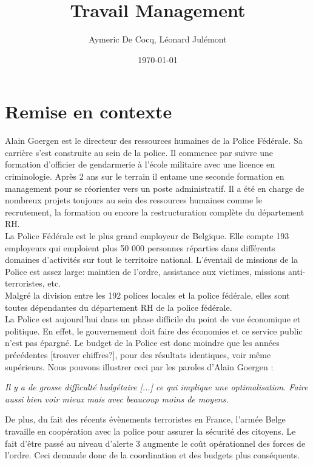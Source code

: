 \documentclass[12pt]{article}
\title{Travail Management}
\author{Aymeric De Cocq, Léonard Julémont}
\date{\today}
\begin{document}
\maketitle

\section{Remise en contexte}


Alain Goergen est le directeur des ressources humaines de la Police Fédérale. Sa carrière s'est construite au sein de la police. Il commence par suivre une formation d'officier de gendarmerie à l'école militaire avec une licence en criminologie. Après 2 ans sur le terrain il entame une seconde formation en management pour se réorienter vers un poste administratif. Il a été en charge de nombreux projets toujours au sein des ressources humaines comme le recrutement, la formation ou encore la restructuration complète du département RH.\\

La Police Fédérale est le plus grand employeur de Belgique. Elle compte 193 employeurs qui emploient plus 50 000 personnes réparties dans différents domaines d'activités sur tout le territoire national. L'éventail de missions de la Police est assez large: maintien de l'ordre, assistance aux victimes, missions anti-terroristes, etc.\\

Malgré la division entre les 192 polices locales et la police fédérale, elles sont toutes dépendantes du département RH de la police fédérale.\\
 
La Police est aujourd'hui dans un phase difficile du point de vue économique et politique. En effet, le gouvernement doit faire des économies et ce service public n'est pas épargné. Le budget de la Police est donc moindre que les années précédentes [trouver chiffres?], pour des résultats identiques, voir même supérieurs. Nous pouvons illustrer ceci par les paroles d'Alain Goergen : 

\begin{center}
	\textit{Il y a de grosse difficulté budgétaire [...] ce qui implique une optimalisation. Faire aussi bien voir mieux mais avec beaucoup moins de moyens.}
\end{center} 

De plus, du fait des récents évènements terroristes en France, l'armée Belge travaille en coopération avec la police pour assurer la sécurité des citoyens. Le fait d'être passé au niveau d'alerte 3 augmente le coût opérationnel des forces de l'ordre. Ceci demande donc de la coordination et des budgets plus conséquents.
\end{document}
